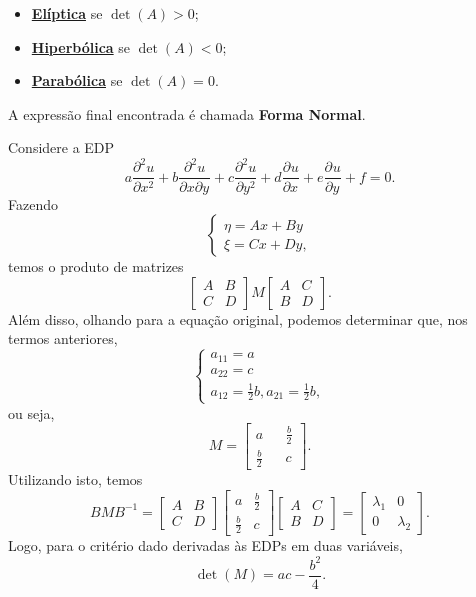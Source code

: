 \documentclass[.../pde_notes.tex]{subfiles}
\begin{document}
\begin{itemize}
	\item \underline{\textbf{Elíptica}} se \(\det{(A)} > 0\);
	\item \underline{\textbf{Hiperbólica}} se \(\det{(A)} < 0\);
	\item \underline{\textbf{Parabólica}} se \(\det{(A)} = 0\).
\end{itemize}
A expressão final encontrada é chamada \textbf{Forma Normal}.
\hypertarget{nextclass1}{\begin{example}
		Considere a EDP
		\[
			a \frac{\partial^{2}u}{\partial x^{2}} + b \frac{\partial^{2}u}{\partial x \partial y^{}} + c \frac{\partial^{2}u}{\partial y^{2}} + d \frac{\partial^{}u}{\partial x^{}} + e \frac{\partial^{}u}{\partial y^{}} + f = 0.
		\]
		Fazendo
		\[
			\left\{\begin{array}{ll}
				\eta = Ax + By \\
				\xi = Cx + Dy,
			\end{array}\right.
		\]
		temos o produto de matrizes
		\[
			\begin{bmatrix}
				A & B \\
				C & D
			\end{bmatrix} M \begin{bmatrix}
				A & C \\
				B & D
			\end{bmatrix}.
		\]
		Além disso, olhando para a equação original, podemos determinar que, nos termos anteriores,
		\[
			\left\{\begin{array}{ll}
				a_{11} = a \\
				a_{22} = c \\
				a_{12} = \frac{1}{2}b,
				a_{21} = \frac{1}{2}b,
			\end{array}\right.
		\]
		ou seja,
		\[
			M = \begin{bmatrix}
				a           &  & \frac{b}{2} \\
				\frac{b}{2} &  & c
			\end{bmatrix}.
		\]
		Utilizando isto, temos
		\[
			BMB^{-1} = \begin{bmatrix}
				A & B \\
				C & D
			\end{bmatrix} \begin{bmatrix}
				a           & \frac{b}{2} \\
				\frac{b}{2} & c
			\end{bmatrix} \begin{bmatrix}
				A & C \\
				B & D
			\end{bmatrix} = \begin{bmatrix}
				\lambda_1 & 0           \\
				0         & \lambda_{2}
			\end{bmatrix}.
		\]
		Logo, para o critério dado derivadas às EDPs em duas variáveis,
		\[
			\det{(M)} = ac - \frac{b^{2}}{4}.
		\]
	\end{example}}
\end{document}
